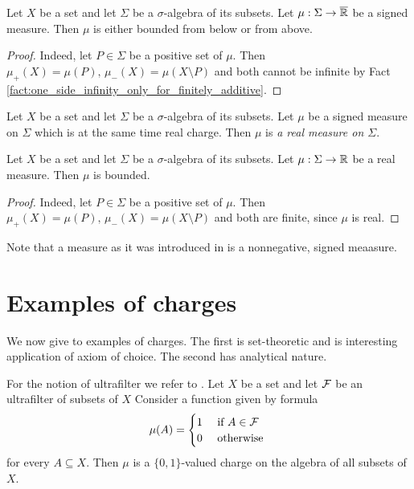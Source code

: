 \begin{corollary}\label{corollary:signed_measures_are_one_sided_bounded}
    Let $X$ be a set and let $\Sigma$ be a $\sigma$-algebra of its subsets. Let $\mu:\Sigma \rightarrow \overline{{\mathbb R}}$ be a signed measure. Then $\mu$ is either bounded from below or from above.
\end{corollary}
\begin{proof}
    Indeed, let $P \in \Sigma$ be a positive set of $\mu$. Then $\mu_+(X) = \mu(P),\,\mu_-(X) = \mu(X\setminus P)$ and both cannot be infinite by Fact \ref{fact:one_side_infinity_only_for_finitely_additive}.
\end{proof}

\begin{definition}
    Let $X$ be a set and let $\Sigma$ be a $\sigma$-algebra of its subsets. Let $\mu$ be a signed measure on $\Sigma$ which is at the same time real charge. Then $\mu$ is \textit{a real measure on $\Sigma$}.
\end{definition}

\begin{corollary}\label{corollary:real_measures_are_bounded}
    Let $X$ be a set and let $\Sigma$ be a $\sigma$-algebra of its subsets. Let $\mu:\Sigma \rightarrow {\mathbb R}$ be a real measure. Then $\mu$ is bounded.
\end{corollary}
\begin{proof}
    Indeed, let $P \in \Sigma$ be a positive set of $\mu$. Then $\mu_+(X) = \mu(P),\,\mu_-(X) = \mu(X\setminus P)$ and both are finite, since $\mu$ is real.
\end{proof}

\begin{remark}\label{remark:measure_is_nonnegative_signed_measure}
    Note that a measure as it was introduced in \cite{Integration} is a nonnegative, signed meaasure.
\end{remark}


\section{Examples of charges}
\noindent
We now give to examples of charges. The first is set-theoretic and is interesting application of axiom of choice. The second has analytical nature.

\begin{example}\label{example:ultrafilter_charge}
    For the notion of ultrafilter we refer to \cite{Filters_in_topology}. Let $X$ be a set and let ${\mathcal F}$ be an ultrafilter of subsets of $X$  Consider a function given by formula
    $$\mu(A) = \begin{cases}
            1 & \mbox{ if }A \in {\mathcal F} \\
            0 & \mbox{ otherwise }   \\
        \end{cases}
    $$
    for every $A \subseteq X$. Then $\mu$ is a $\{0,1\}$-valued charge on the algebra of all subsets of $X$.
\end{example}

